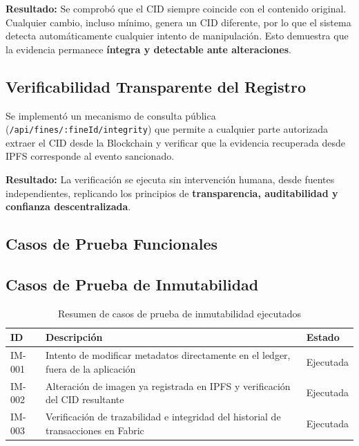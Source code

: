 \documentclass[
    letterpaper, 
    man,   
    spanish,
    12pt,
    donotrepeattitle,
    floatsintext,
    hidelinks %
]{apa7}
\begin{document}
\textbf{Resultado:} Se comprobó que el CID siempre coincide con el contenido original. Cualquier cambio, incluso mínimo, genera un CID diferente, por lo que el sistema detecta automáticamente cualquier intento de manipulación. Esto demuestra que la evidencia permanece \textbf{íntegra y detectable ante alteraciones}.

\subsection{Verificabilidad Transparente del Registro}

Se implementó un mecanismo de consulta pública (\texttt{/api/fines/:fineId/integrity}) que permite a cualquier parte autorizada extraer el CID desde la Blockchain y verificar que la evidencia recuperada desde IPFS corresponde al evento sancionado.

\textbf{Resultado:} La verificación se ejecuta sin intervención humana, desde fuentes independientes, replicando los principios de \textbf{transparencia, auditabilidad y confianza descentralizada}.

\subsection{Casos de Prueba Funcionales}



\subsection{Casos de Prueba de Inmutabilidad}

\begin{table}[htbp]
\centering
\begin{tabular}{|p{2cm}|p{6cm}|p{3cm}|}
\hline
\textbf{ID} & \textbf{Descripción} & \textbf{Estado} \\
\hline
IM-001 & Intento de modificar metadatos directamente en el ledger, fuera de la aplicación & Ejecutada \\
\hline
IM-002 & Alteración de imagen ya registrada en IPFS y verificación del CID resultante & Ejecutada \\
\hline
IM-003 & Verificación de trazabilidad e integridad del historial de transacciones en Fabric & Ejecutada \\
\hline
\end{tabular}
\caption{Resumen de casos de prueba de inmutabilidad ejecutados}
\end{table}
\end{document}

